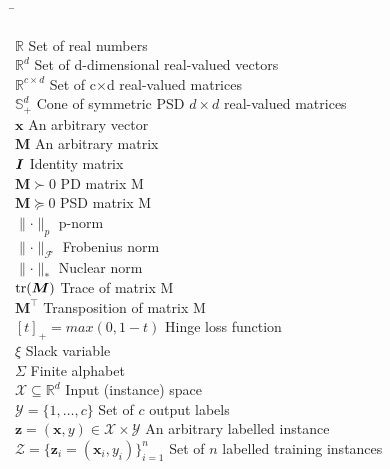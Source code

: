 

\begin{tabbing}
\hspace{150pt}\=\kill

$\mathbb{R}$ \> Set of real numbers \\
$\mathbb{R}^d$ \> Set of d-dimensional real-valued vectors \\
$\mathbb{R}^{c \times d}$ \> Set of c$\times$d real-valued matrices \\
$\mathbb{S}^{d}_+$ \> Cone of symmetric PSD $d \times d$ real-valued matrices \\

$\textbf{x}$ \> An arbitrary vector \\
$\bm{M}$ \> An arbitrary matrix \\
$\textbf{\textit{I}}$ \> Identity matrix \\
$\bm{M} \succ 0$ \> PD matrix M \\
$\bm{M} \succeq 0$ \> PSD matrix M \\
$\parallel \cdot \parallel_p$ \> p-norm \\
$\parallel \cdot \parallel_\mathcal{F}$ \> Frobenius norm \\
$\parallel \cdot \parallel_*$ \> Nuclear norm \\
$\operatorname*{tr}(\bm{M})$ \> Trace of matrix M \\
$\bm{M}^\top$ \> Transposition of matrix M \\
$[t]_+ = max(0, 1-t)$ \> Hinge loss function \\
$\xi$ \> Slack variable \\
$\Sigma$ \> Finite alphabet \\

$\mathcal{X} \subseteq \mathbb{R}^d$ \> Input (instance) space \\
$\mathcal{Y} = \{ 1, \ldots ,c \}$ \> Set of $c$ output labels \\
$\bm{z}=(\bm{x},y) \in \mathcal{X} \times \mathcal{Y}$ \> An arbitrary labelled instance \\
$\mathcal{Z}=\{\bm{z}_i=(\bm{x}_i, y_i)\}^n_{i=1}$ \> Set of $n$ labelled training instances \\


\end{tabbing}
